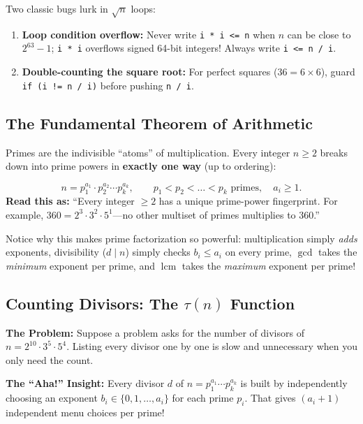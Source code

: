 \documentclass[11pt,a4paper]{article}
\theoremstyle{definition}
\newcommand{\painbeat}{\textbf{\color{accentamber}The Problem:} }
\newcommand{\ahabeat}{\textbf{\color{accentteal}The ``Aha!'' Insight:} }
\begin{document}
\begin{watchoutbox}
Two classic bugs lurk in $\sqrt{n}$ loops:
\begin{enumerate}
    \item \textbf{Loop condition overflow:} Never write \texttt{i * i <= n} when $n$ can be close to $2^{63} - 1$; \texttt{i * i} overflows signed 64-bit integers! Always write \texttt{i <= n / i}.
    \item \textbf{Double-counting the square root:} For perfect squares ($36 = 6 \times 6$), guard \texttt{if (i != n / i)} before pushing \texttt{n / i}.
\end{enumerate}
\end{watchoutbox}

\subsection{The Fundamental Theorem of Arithmetic}

Primes are the indivisible ``atoms'' of multiplication. Every integer $n \ge 2$ breaks down into prime powers in \textbf{exactly one way} (up to ordering):

\begin{formulabox}
\[
    n = p_1^{a_1} \cdot p_2^{a_2} \cdots p_k^{a_k}, \qquad p_1 < p_2 < \dots < p_k \text{ primes},\quad a_i \ge 1.
\]
\textbf{Read this as:} ``Every integer $\ge 2$ has a unique prime-power fingerprint. For example, $360 = 2^3 \cdot 3^2 \cdot 5^1$---no other multiset of primes multiplies to $360$.''
\end{formulabox}

Notice why this makes prime factorization so powerful: multiplication simply \emph{adds} exponents, divisibility ($d \mid n$) simply checks $b_i \le a_i$ on every prime, $\gcd$ takes the \emph{minimum} exponent per prime, and $\operatorname{lcm}$ takes the \emph{maximum} exponent per prime!

\subsection{Counting Divisors: The \texorpdfstring{$\tau(n)$}{tau(n)} Function}

\painbeat Suppose a problem asks for the number of divisors of $n = 2^{10} \cdot 3^5 \cdot 5^4$. Listing every divisor one by one is slow and unnecessary when you only need the count.

\ahabeat Every divisor $d$ of $n = p_1^{a_1} \cdots p_k^{a_k}$ is built by independently choosing an exponent $b_i \in \{0, 1, \dots, a_i\}$ for each prime $p_i$. That gives $(a_i + 1)$ independent menu choices per prime!
\end{document}

